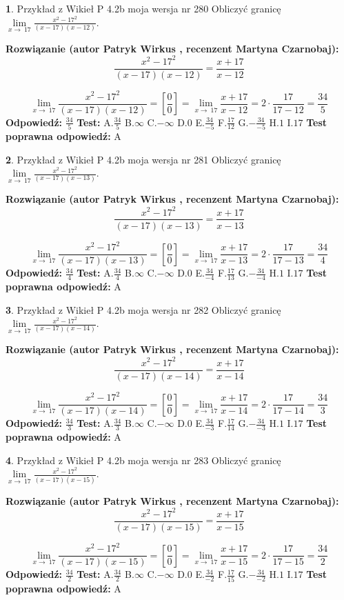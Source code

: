 \documentclass[12pt, a4paper]{article}
\theoremstyle{definition} %
\newtheorem{zad}{}
\newcommand{\zadStart}[1]{\begin{zad}#1\newline}
\newcommand{\zadStop}{\end{zad}}
\newcommand{\rozwStart}[2]{\noindent \textbf{Rozwiązanie (autor #1 , recenzent #2): }\newline}
\newcommand{\rozwStop}{\newline}
\newcommand{\odpStart}{\noindent \textbf{Odpowiedź:}\newline}
\newcommand{\odpStop}{\newline}
\newcommand{\testStart}{\noindent \textbf{Test:}\newline}
\newcommand{\testStop}{\newline}
\newcommand{\kluczStart}{\noindent \textbf{Test poprawna odpowiedź:}\newline}
\newcommand{\kluczStop}{\newline}
\begin{document}
\zadStart{Przykład z Wikieł P 4.2b moja wersja nr 280}
Obliczyć granicę $\lim\limits_{x\to\ 17}\frac{x^{2}-17^{2}}{(x-17)(x-12)}$.
\zadStop
\rozwStart{Patryk Wirkus}{Martyna Czarnobaj}
$$\frac{x^{2}-17^{2}}{(x-17)(x-12)}=\frac{x+17}{x-12}$$

$$\lim\limits_{x\to\ 17}\frac{x^{2}-17^{2}}{(x-17)(x-12)}=[\frac{0}{0}]=\lim\limits_{x\to\ 17}\frac{x+17}{x-12}=2 \cdot \frac{17}{17-12} = \frac{34}{5}$$
\rozwStop
\odpStart
$\frac{34}{5}$
\odpStop
\testStart
A.$\frac{34}{5}$
B.$\infty$
C.$-\infty$
D.$0$
E.$\frac{34}{-5}$
F.$\frac{17}{12}$
G.$-\frac{34}{-5}$
H.$1$
I.$17$
\testStop
\kluczStart
A
\kluczStop



\zadStart{Przykład z Wikieł P 4.2b moja wersja nr 281}
Obliczyć granicę $\lim\limits_{x\to\ 17}\frac{x^{2}-17^{2}}{(x-17)(x-13)}$.
\zadStop
\rozwStart{Patryk Wirkus}{Martyna Czarnobaj}
$$\frac{x^{2}-17^{2}}{(x-17)(x-13)}=\frac{x+17}{x-13}$$

$$\lim\limits_{x\to\ 17}\frac{x^{2}-17^{2}}{(x-17)(x-13)}=[\frac{0}{0}]=\lim\limits_{x\to\ 17}\frac{x+17}{x-13}=2 \cdot \frac{17}{17-13} = \frac{34}{4}$$
\rozwStop
\odpStart
$\frac{34}{4}$
\odpStop
\testStart
A.$\frac{34}{4}$
B.$\infty$
C.$-\infty$
D.$0$
E.$\frac{34}{-4}$
F.$\frac{17}{13}$
G.$-\frac{34}{-4}$
H.$1$
I.$17$
\testStop
\kluczStart
A
\kluczStop



\zadStart{Przykład z Wikieł P 4.2b moja wersja nr 282}
Obliczyć granicę $\lim\limits_{x\to\ 17}\frac{x^{2}-17^{2}}{(x-17)(x-14)}$.
\zadStop
\rozwStart{Patryk Wirkus}{Martyna Czarnobaj}
$$\frac{x^{2}-17^{2}}{(x-17)(x-14)}=\frac{x+17}{x-14}$$

$$\lim\limits_{x\to\ 17}\frac{x^{2}-17^{2}}{(x-17)(x-14)}=[\frac{0}{0}]=\lim\limits_{x\to\ 17}\frac{x+17}{x-14}=2 \cdot \frac{17}{17-14} = \frac{34}{3}$$
\rozwStop
\odpStart
$\frac{34}{3}$
\odpStop
\testStart
A.$\frac{34}{3}$
B.$\infty$
C.$-\infty$
D.$0$
E.$\frac{34}{-3}$
F.$\frac{17}{14}$
G.$-\frac{34}{-3}$
H.$1$
I.$17$
\testStop
\kluczStart
A
\kluczStop



\zadStart{Przykład z Wikieł P 4.2b moja wersja nr 283}
Obliczyć granicę $\lim\limits_{x\to\ 17}\frac{x^{2}-17^{2}}{(x-17)(x-15)}$.
\zadStop
\rozwStart{Patryk Wirkus}{Martyna Czarnobaj}
$$\frac{x^{2}-17^{2}}{(x-17)(x-15)}=\frac{x+17}{x-15}$$

$$\lim\limits_{x\to\ 17}\frac{x^{2}-17^{2}}{(x-17)(x-15)}=[\frac{0}{0}]=\lim\limits_{x\to\ 17}\frac{x+17}{x-15}=2 \cdot \frac{17}{17-15} = \frac{34}{2}$$
\rozwStop
\odpStart
$\frac{34}{2}$
\odpStop
\testStart
A.$\frac{34}{2}$
B.$\infty$
C.$-\infty$
D.$0$
E.$\frac{34}{-2}$
F.$\frac{17}{15}$
G.$-\frac{34}{-2}$
H.$1$
I.$17$
\testStop
\kluczStart
A
\kluczStop
\end{document}
